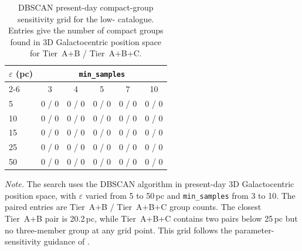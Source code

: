 \begin{table}[htbp]
\centering
\caption{DBSCAN present-day compact-group sensitivity grid for the low-\vgrf{} catalogue.  Entries give the number of compact groups found in 3D Galactocentric position space for Tier~A+B / Tier~A+B+C.\label{tab:cluster_search}}
\scriptsize
\setlength{\tabcolsep}{4pt}
\begin{tabular}{lccccc}
\hline\hline
$\varepsilon$ (pc) & \multicolumn{5}{c}{\texttt{min\_samples}} \\
\cline{2-6}
 & 3 & 4 & 5 & 7 & 10 \\
\hline
5  & 0 / 0 & 0 / 0 & 0 / 0 & 0 / 0 & 0 / 0 \\
10 & 0 / 0 & 0 / 0 & 0 / 0 & 0 / 0 & 0 / 0 \\
15 & 0 / 0 & 0 / 0 & 0 / 0 & 0 / 0 & 0 / 0 \\
25 & 0 / 0 & 0 / 0 & 0 / 0 & 0 / 0 & 0 / 0 \\
50 & 0 / 0 & 0 / 0 & 0 / 0 & 0 / 0 & 0 / 0 \\
\hline
\end{tabular}
\vspace{0.5ex}

\begin{minipage}{0.95\columnwidth}
\footnotesize
\textit{Note.} The search uses the \citet{Ester1996} DBSCAN algorithm in present-day 3D Galactocentric position space, with $\varepsilon$ varied from 5 to 50\,pc and \texttt{min\_samples} from 3 to 10.  The paired entries are Tier~A+B / Tier~A+B+C group counts.  The closest Tier~A+B pair is 20.2\,pc, while Tier~A+B+C contains two pairs below 25\,pc but no three-member group at any grid point.  This grid follows the parameter-sensitivity guidance of \citet{Schubert2017}.
\end{minipage}
\end{table}

